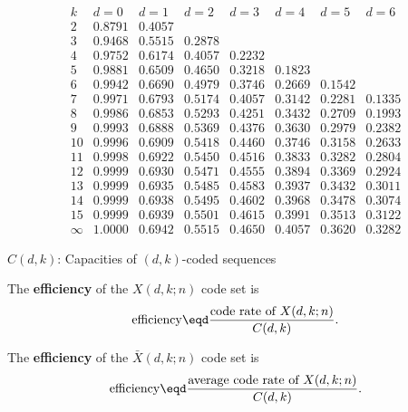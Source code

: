 \begin{table*}[t]
\begin{fsL}
\[
\begin{array}{r|*{7}{l}}
    k     &    d=0 &    d=1 &    d=2 &    d=3 &    d=4 &    d=5 &    d=6\\
\hline      
    2     & 0.8791 & 0.4057  \\ 
    3     & 0.9468 & 0.5515 & 0.2878 \\
    4     & 0.9752 & 0.6174 & 0.4057 & 0.2232 \\ 
    5     & 0.9881 & 0.6509 & 0.4650 & 0.3218 & 0.1823 \\
    6     & 0.9942 & 0.6690 & 0.4979 & 0.3746 & 0.2669 & 0.1542  \\
    7     & 0.9971 & 0.6793 & 0.5174 & 0.4057 & 0.3142 & 0.2281 & 0.1335 \\
    8     & 0.9986 & 0.6853 & 0.5293 & 0.4251 & 0.3432 & 0.2709 & 0.1993 \\
    9     & 0.9993 & 0.6888 & 0.5369 & 0.4376 & 0.3630 & 0.2979 & 0.2382 \\
   10     & 0.9996 & 0.6909 & 0.5418 & 0.4460 & 0.3746 & 0.3158 & 0.2633 \\
   11     & 0.9998 & 0.6922 & 0.5450 & 0.4516 & 0.3833 & 0.3282 & 0.2804 \\
   12     & 0.9999 & 0.6930 & 0.5471 & 0.4555 & 0.3894 & 0.3369 & 0.2924 \\
   13     & 0.9999 & 0.6935 & 0.5485 & 0.4583 & 0.3937 & 0.3432 & 0.3011 \\
   14     & 0.9999 & 0.6938 & 0.5495 & 0.4602 & 0.3968 & 0.3478 & 0.3074 \\
   15     & 0.9999 & 0.6939 & 0.5501 & 0.4615 & 0.3991 & 0.3513 & 0.3122 \\
   \infty & 1.0000 & 0.6942 & 0.5515 & 0.4650 & 0.4057 & 0.3620 & 0.3282
\end{array}
\]
\end{fsL}
\caption{
   $C(d,k)$: Capacities of $(d,k)$-coded sequences
   \label{tbl:C(d,k)}
   }
\end{table*}


\begin{definition}
The {\bf efficiency} of the $X(d,k;n)$ code set is
\[
    \mathrm{efficiency} \eqd \frac{\mbox{code rate of } X(d,k;n)}{C(d,k)}.
\]

The {\bf efficiency} of the $\bar{X}(d,k;n)$ code set is
\[
    \mathrm{efficiency} \eqd \frac{\mbox{average code rate of } X(d,k;n)}{C(d,k)}.
\]
\end{definition}


